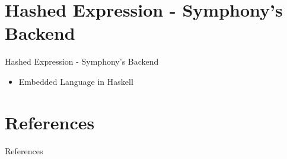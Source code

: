 \documentclass[presentation]{beamer}
\begin{document}
\section{Hashed Expression - Symphony's Backend}
\label{sec:org737f90f}
\begin{frame}[label={sec:org4426ae4}]{Hashed Expression - Symphony's Backend}
\begin{itemize}
\item Embedded Language in \alert{Haskell}
\end{itemize}
\end{frame}
\section{References}
\label{sec:org7908282}
\begin{frame}[label={sec:orga2b0704}]{References}
\printbibliography[heading=none]
\end{frame}
\end{document}

